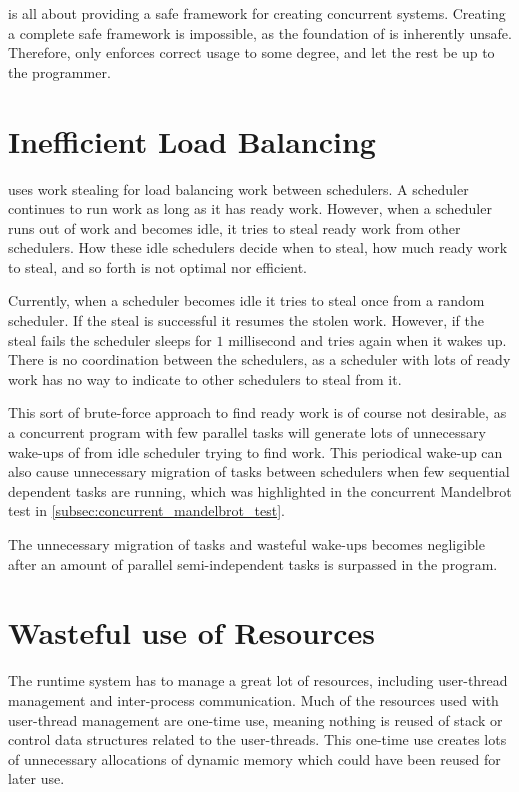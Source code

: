 \Proxc{} is all about providing a safe framework for creating concurrent systems. Creating a complete safe framework is impossible, as the foundation of \Cpp{} is inherently unsafe. Therefore, \Proxc{} only enforces correct usage to some degree, and let the rest be up to the programmer.


\section{Inefficient Load Balancing}


\Proxc{} uses work stealing for load balancing work between schedulers. A scheduler continues to run work as long as it has ready work. However, when a scheduler runs out of work and becomes idle, it tries to steal ready work from other schedulers. How these idle schedulers decide when to steal, how much ready work to steal, and so forth is not optimal nor efficient.

Currently, when a scheduler becomes idle it tries to steal once from a random scheduler. If the steal is successful it resumes the stolen work. However, if the steal fails the scheduler sleeps for $1$ millisecond and tries again when it wakes up. There is no coordination between the schedulers, as a scheduler with lots of ready work has no way to indicate to other schedulers to steal from it. 

This sort of brute\hyp{}force approach to find ready work is of course not desirable, as a concurrent program with few parallel tasks will generate lots of unnecessary wake\hyp{}ups of from idle scheduler trying to find work. This periodical wake\hyp{}up can also cause unnecessary migration of tasks between schedulers when few sequential dependent tasks are running, which was highlighted in the concurrent Mandelbrot test in \cref{subsec:concurrent_mandelbrot_test}.

The unnecessary migration of tasks and wasteful wake\hyp{}ups becomes negligible after an amount of parallel semi\hyp{}independent tasks is surpassed in the program.


\section{Wasteful use of Resources}


The \Proxc{} runtime system has to manage a great lot of resources, including user\hyp{}thread management and inter\hyp{}process communication. Much of the resources used with user\hyp{}thread management are one\hyp{}time use, meaning nothing is reused of stack or control data structures related to the user\hyp{}threads. This one\hyp{}time use creates lots of unnecessary allocations of dynamic memory which could have been reused for later use.

